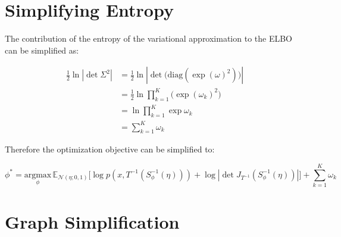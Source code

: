 \documentclass[10pt]{article}
\begin{document}
\section*{Simplifying Entropy}

The contribution of the entropy of the variational approximation to the ELBO can be simplified as:

\begin{align*}
  \frac{1}{2}\ln| \det \Sigma ^ 2| &= \frac{1}{2}\ln |\det \big(\text{diag}(\exp(\omega) ^ 2)\big)|  \\
  &= \frac{1}{2}\ln \prod_{k=1}^{K}\big(\exp(\omega_k)^2\big) \\
  &= \ln \prod_{k=1}^{K}\exp \omega_k \\
  &= \sum_{k=1}^{K}\omega_k
\end{align*}

Therefore the optimization objective can be simplified to:

\begin{equation*}
  \phi^* = \underset{\phi}{\text{argmax}} \, \mathbb{E}_{\mathcal{N}(\eta; 0, 1)}\big[\log p(x, T^{-1}(S_\phi^{-1}(\eta))) + \log |\det J_{T^{-1}}(S_\phi^{-1}(\eta))|\big] + \sum_{k=1}^{K}\omega_k
\end{equation*}


\section*{Graph Simplification}
\end{document}
